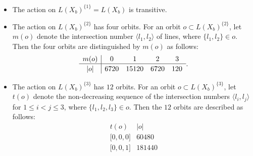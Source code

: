 \documentclass{math}
\theoremstyle{plain}
\numberwithin{equation}{section}
\newcommand{\mystruth}[1]{\phantom{\hbox{\vrule height #1}}}
\newcommand{\intf}[1]{\langle #1 \rangle}
\begin{document}
\begin{itemize}[itemsep=5pt]
%
\item The action on $L(X_b)^{\{1\}}=L(X_b)$  is transitive.
%
\item
The  action on $L(X_b)^{\{2\}}$  has four orbits.
For an orbit $o\subset L(X_b)^{\{2\}}$,
let $m(o)$ denote the intersection number $\intf{l_1, l_2}$ of lines,   
where  $\{l_1, l_2\}\in o$.
Then the four orbits are distinguished  by $m(o)$ as follows:
\[
\begin{array}{c|cccc}
m(o) & 0 & 1 & 2 & 3 \\
\hline 
|o| & 6720 & 15120 & 6720 & 120\mystruth{10pt}
\end{array}.
\]
%
\item
The  action on $L(X_b)^{\{3\}}$  has $12$ orbits.
For an orbit $o\subset L(X_b)^{\{3\}}$,
let $t(o)$ denote 
the non-decreasing sequence of the intersection numbers $\intf{l_i, l_j}$ 
for $1\le i<j\le 3$,
where  $\{l_1, l_2, l_3\}\in o$.
Then the $12$ orbits are described as follows:
%
\begin{equation*}\label{eq:ots}
%
\begin{array}{ll}
t(o) & |o| \\
\hline 
 {[} 0, 0, 0 {]}& 60480\\
 {[} 0, 0, 1 {]}& 181440\\ 

\end{array}
\end{equation*}
\end{itemize}
\end{document}
